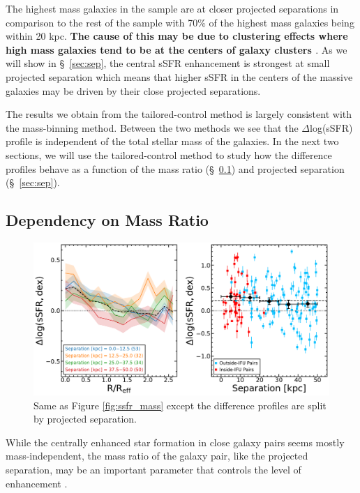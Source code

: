 \documentclass[iop,revtex4,twocolumn,apj,numberedappendix,appendixfloats]{emulateapj}
\begin{document}
The highest mass galaxies in the sample are at closer projected separations in comparison to the rest of the sample with 70\% of the highest mass galaxies being within 20 kpc. \textbf{ The cause of this may be due to clustering effects where high mass galaxies tend to be at the centers of galaxy clusters \citep{Cooray:2002, Zehavi:2002}}. As we will show in \S~\ref{sec:sep}, the central sSFR enhancement is strongest at small projected separation which means that higher sSFR in the centers of the massive galaxies may be driven by their close projected separations. 



The results we obtain from the tailored-control method is largely consistent with the mass-binning method. Between the two methods we see that the $\Delta$log(sSFR) profile is independent of the total stellar mass of the galaxies. In the next two sections, we will use the tailored-control method to study how the difference profiles behave as a function of the mass ratio (\S~\ref{sec:dm}) and projected separation (\S~\ref{sec:sep}).

\subsection{Dependency on Mass Ratio}\label{sec:dm}

\begin{figure}
\centering
\includegraphics[width=0.8\linewidth]{fig/ssfr_sep.pdf}
\caption[]{Same as Figure \ref{fig:ssfr_mass} except the difference profiles are split by projected separation. }
\label{fig:ssfr_sep}
\end{figure}

While the centrally enhanced star formation in close galaxy pairs seems mostly mass-independent, the mass ratio of the galaxy pair, like the projected separation, may be an important parameter that controls the level of enhancement \citep{Ellison:2008}. 
\end{document}

